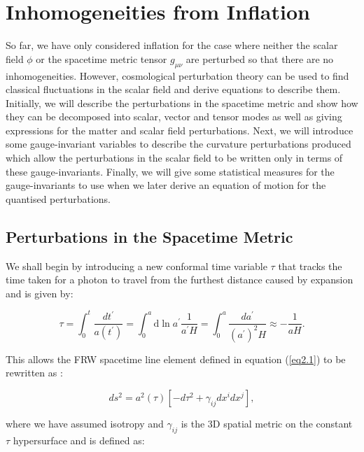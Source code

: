 \documentclass[a4paper,12pt,twoside]{report}
\begin{document}
\section{Inhomogeneities from Inflation} \label{sec:InhomoInflat}

So far, we have only considered inflation for the case where neither the scalar field $\phi$ or the spacetime metric tensor $g_{\mu \nu}$ are perturbed so that there are no inhomogeneities. However, cosmological perturbation theory can be used to find classical fluctuations in the scalar field and derive equations to describe them. Initially, we will describe the perturbations in the spacetime metric and show how they can be decomposed into scalar, vector and tensor modes as well as giving expressions for the matter and scalar field perturbations. Next, we will introduce some gauge-invariant variables to describe the curvature perturbations produced which allow the perturbations in the scalar field to be written only in terms of these gauge-invariants. Finally, we will give some statistical measures for the gauge-invariants to use when we later derive an equation of motion for the quantised perturbations.

\subsection{Perturbations in the Spacetime Metric} \label{CosPertTh}

We shall begin by introducing a new conformal time variable $\tau$ that tracks the time taken for a photon to travel from the furthest distance caused by expansion and is given by:

\begin{equation} \label{eq2.31}
\tau = \int_{0}^{t} \frac{dt^{\prime}}{a(t^{\prime})} = \int_{0}^{a} \mathrm{d}\ln a^{\prime} \frac{1}{a^{\prime} H} = \int_{0}^{a} \frac{da^{\prime}}{(a^{\prime})^{2} H} \approx -\frac{1}{aH}.
\end{equation}

This allows the FRW spacetime line element defined in equation (\ref{eq2.1}) to be rewritten as \cite{Baumann:2009ds}: 

\begin{equation} \label{eq2.32}
ds^{2} = a^{2}(\tau) \left[-d\tau^{2} + \gamma_{ij}dx^{i}dx^{j} \right],
\end{equation}

where we have assumed isotropy and $\gamma_{ij}$ is the 3D spatial metric on the constant $\tau$ hypersurface and is defined as:
\end{document}
